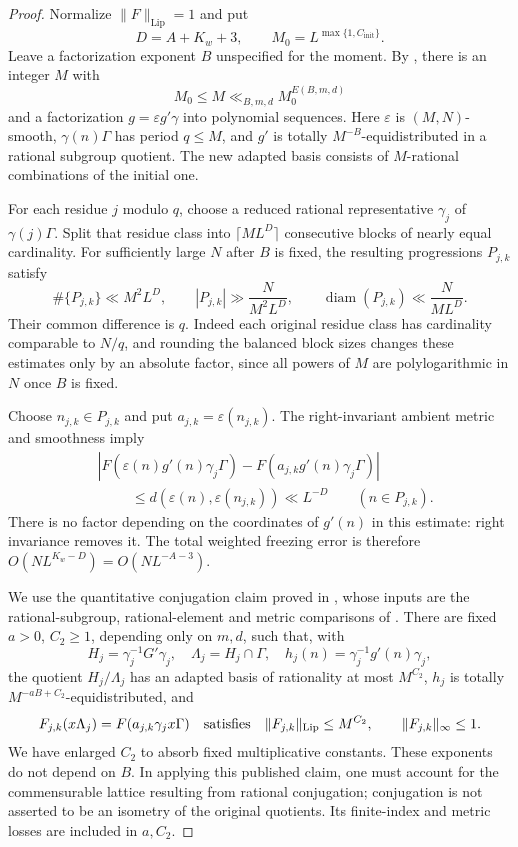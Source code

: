 \begin{proof}
Normalize $\|F\|_{\mathrm{Lip}}=1$ and put
\[
 D=A+K_w+3,\qquad M_0=L^{\max\{1,C_{\mathrm{init}}\}}.
\]
Leave a factorization exponent $B$ unspecified for the moment. By
\cite[Theorem 1.19]{GTOrbits2012}, there is an integer $M$ with
\[
 M_0\leq M\ll_{B,m,d}M_0^{E(B,m,d)}
\]
and a factorization $g=\varepsilon g'\gamma$ into polynomial sequences.
Here $\varepsilon$ is $(M,N)$-smooth, $\gamma(n)\Gamma$ has period
$q\leq M$, and $g'$ is totally $M^{-B}$-equidistributed in a rational
subgroup quotient. The new adapted basis consists of $M$-rational
combinations of the initial one.

For each residue $j$ modulo $q$, choose a reduced rational representative
$\gamma_j$ of $\gamma(j)\Gamma$. Split that residue class into
$\lceil ML^D\rceil$ consecutive blocks of nearly equal cardinality.
For sufficiently large $N$ after $B$ is fixed, the resulting progressions
$P_{j,k}$ satisfy
\begin{equation}\label{eq:gf-cells}
 \#\{P_{j,k}\}\ll M^2L^D,\qquad
 |P_{j,k}|\gg\frac{N}{M^2L^D},\qquad
 \operatorname{diam}(P_{j,k})\ll\frac{N}{ML^D}.
\end{equation}
Their common difference is $q$. Indeed each original residue class has
cardinality comparable to $N/q$, and rounding the balanced block sizes
changes these estimates only by an absolute factor, since all powers of
$M$ are polylogarithmic in $N$ once $B$ is fixed.

Choose $n_{j,k}\in P_{j,k}$ and put $a_{j,k}=\varepsilon(n_{j,k})$.
The right-invariant ambient metric and smoothness imply
\begin{align*}
 &|F(\varepsilon(n)g'(n)\gamma_j\Gamma)
       -F(a_{j,k}g'(n)\gamma_j\Gamma)|\\
 &\hspace{1cm}\leq d(\varepsilon(n),\varepsilon(n_{j,k}))
       \ll L^{-D}\qquad(n\in P_{j,k}).
\end{align*}
There is no factor depending on the coordinates of $g'(n)$ in this
estimate: right invariance removes it. The total weighted freezing
error is therefore $O(NL^{K_w-D})=O(NL^{-A-3})$.

We use the quantitative conjugation claim proved in
\cite[p.~547]{moebius}, whose inputs are the rational-subgroup,
rational-element and metric comparisons of
\cite[Appendix A]{GTOrbits2012}. There are fixed $a>0$, $C_2\geq1$,
depending only on $m,d$, such that, with
\[
 H_j=\gamma_j^{-1}G'\gamma_j,\quad
 \Lambda_j=H_j\cap\Gamma,\quad
 h_j(n)=\gamma_j^{-1}g'(n)\gamma_j,
\]
the quotient $H_j/\Lambda_j$ has an adapted basis of rationality at most
$M^{C_2}$, $h_j$ is totally $M^{-aB+C_2}$-equidistributed, and
\[
 F_{j,k}(x\Lambda_j)=F(a_{j,k}\gamma_jx\Gamma)
 \quad\hbox{satisfies}\quad
 \|F_{j,k}\|_{\mathrm{Lip}}\leq M^{C_2},\qquad
 \|F_{j,k}\|_\infty\leq1.
\]
We have enlarged $C_2$ to absorb fixed multiplicative constants. These
exponents do not depend on $B$. In applying this published claim, one
must account for the commensurable lattice resulting from rational
conjugation; conjugation is not asserted to be an isometry of the
original quotients. Its finite-index and metric losses are included in
$a,C_2$.


\end{proof}
